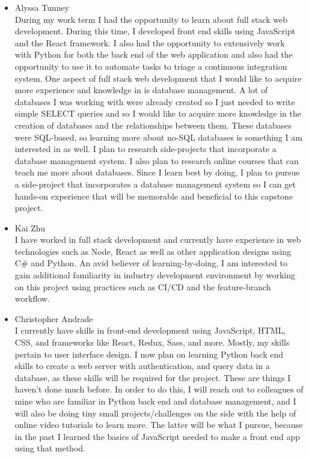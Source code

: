 \documentclass[12pt]{article}
\begin{document}
\begin{itemize}
    \item Alyssa Tunney\\
        During my work term I had the opportunity to learn about full stack web development. During this time, I developed front end skills using JavaScript and the React framework. I also had the opportunity to extensively work with Python for both the back end of the web application and also had the opportunity to use it to automate tasks to triage a continuous integration system. One aspect of full stack web development that I would like to acquire more experience and knowledge in is database management. A lot of databases I was working with were already created so I just needed to write simple SELECT queries and so I would like to acquire more knowledge in the creation of databases and the relationships between them. These databases were SQL-based, so learning more about no-SQL databases is something I am interested in as well. I plan to research side-projects that incorporate a database management system. I also plan to research online courses that can teach me more about databases. Since I learn best by doing, I plan to pursue a side-project that incorporates a database management system so I can get hands-on experience that will be memorable and beneficial to this capstone project.
    \item Kai Zhu\\
        I have worked in full stack development and currently have experience
         in web technologies such as Node, React as well as other application 
         designs using C\# and Python. An avid believer of learning-by-doing, I 
         am interested to gain additional familiarity in industry development 
         environment by working on this project using practices such as CI/CD 
         and the feature-branch workflow.
    \item Christopher Andrade \\
        I currently have skills in front-end development using JavaScript, HTML, CSS, and frameworks like React, Redux, Sass, and more. Mostly, my skills pertain to user interface design. I now plan on learning Python back end skills to create a web server with authentication, and query data in a database, as these skills will be required for the project. These are things I haven't done much before. In order to do this, I will reach out to colleagues of mine who are familiar in Python back end and database management, and I will also be doing tiny small projects/challenges on the side with the help of online video tutorials to learn more. The latter will be what I pursue, because in the past I learned the basics of JavaScript needed to make a front end app using that method. 
    

\end{itemize}
\end{document}
